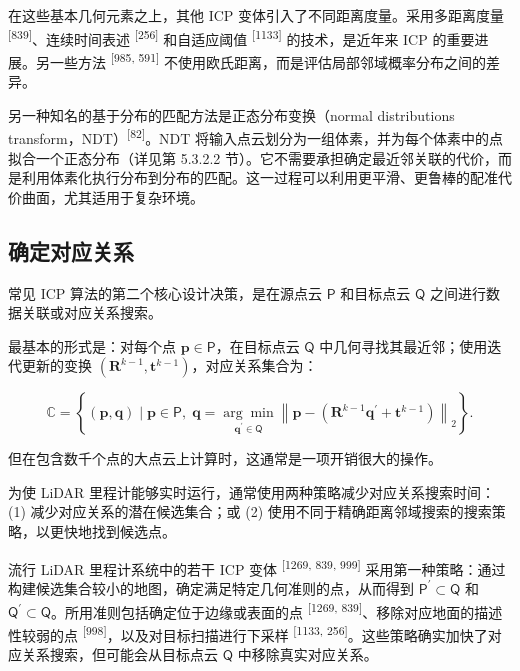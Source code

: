 在这些基本几何元素之上，其他 ICP 变体引入了不同距离度量。采用多距离度量 \textsuperscript{[839]}、连续时间表述 \textsuperscript{[256]} 和自适应阈值 \textsuperscript{[1133]} 的技术，是近年来 ICP 的重要进展。另一些方法 \textsuperscript{[985, 591]} 不使用欧氏距离，而是评估局部邻域概率分布之间的差异。

另一种知名的基于分布的匹配方法是正态分布变换（normal distributions transform，NDT）\textsuperscript{[82]}。NDT 将输入点云划分为一组体素，并为每个体素中的点拟合一个正态分布（详见第 5.3.2.2 节）。它不需要承担确定最近邻关联的代价，而是利用体素化执行分布到分布的匹配。这一过程可以利用更平滑、更鲁棒的配准代价曲面，尤其适用于复杂环境。

\subsection{确定对应关系}

常见 ICP 算法的第二个核心设计决策，是在源点云 $\mathsf {P}$ 和目标点云 $\mathsf {Q}$ 之间进行数据关联或对应关系搜索。

最基本的形式是：对每个点 $\boldsymbol {p} \in \mathsf {P}$，在目标点云 $\mathsf {Q}$ 中几何寻找其最近邻；使用迭代更新的变换 $(\boldsymbol {R}^{k-1}, \boldsymbol {t}^{k-1})$，对应关系集合为：

\begin{equation}
\mathbb {C} = \left\{\left(\boldsymbol {p}, \boldsymbol {q}\right) \mid \boldsymbol {p} \in \mathsf {P},\; \boldsymbol {q} = \underset {\boldsymbol {q}^{\prime} \in \mathsf {Q}} {\arg \min} \left\| \boldsymbol {p} - \left(\boldsymbol {R}^{k-1} \boldsymbol {q}^{\prime} + \boldsymbol {t}^{k-1}\right) \right\| _ {2} \right\}.\tag{8.3}
\end{equation}

但在包含数千个点的大点云上计算时，这通常是一项开销很大的操作。

为使 LiDAR 里程计能够实时运行，通常使用两种策略减少对应关系搜索时间：(1) 减少对应关系的潜在候选集合；或 (2) 使用不同于精确距离邻域搜索的搜索策略，以更快地找到候选点。

流行 LiDAR 里程计系统中的若干 ICP 变体 \textsuperscript{[1269, 839, 999]} 采用第一种策略：通过构建候选集合较小的地图，确定满足特定几何准则的点，从而得到 $\mathsf {P}^{\prime} \subset \mathsf {Q}$ 和 $\mathsf {Q}^{\prime} \subset \mathsf {Q}$。所用准则包括确定位于边缘或表面的点 \textsuperscript{[1269, 839]}、移除对应地面的描述性较弱的点 \textsuperscript{[998]}，以及对目标扫描进行下采样 \textsuperscript{[1133, 256]}。这些策略确实加快了对应关系搜索，但可能会从目标点云 $\mathsf {Q}$ 中移除真实对应关系。

